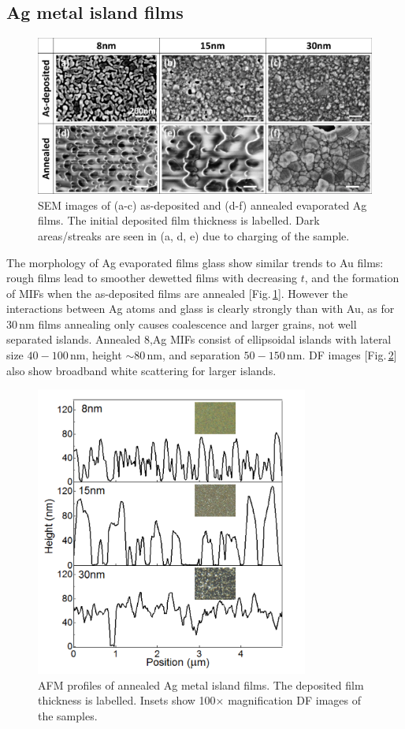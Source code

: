 \subsection{Ag metal island films}
\begin{figure}[ht] 
\centering    
\includegraphics[width=\textwidth]{Fig4}
\caption{SEM images of (a-c) as-deposited and (d-f) annealed evaporated Ag films. The initial deposited film thickness is labelled. Dark areas/streaks are seen in (a, d, e) due to charging of the sample.}
\label{6Fig4}
\end{figure}
The morphology of Ag evaporated films glass show similar trends to Au films: rough films lead to smoother dewetted films with decreasing $t$, and the formation of MIFs when the as-deposited films are annealed [Fig.\,\ref{6Fig4}]. However the interactions between Ag atoms and glass is clearly strongly than with Au, as for 30\,nm films annealing only causes coalescence and larger grains, not well separated islands. Annealed 8,\nm Ag MIFs consist of ellipsoidal islands with lateral size $40-100$\,nm, height $\sim80$\,nm, and separation $50-150$\,nm. DF images [Fig.\,\ref{6Fig5}] also show broadband white scattering for larger islands. 

\begin{figure}[ht] 
\centering    
\includegraphics[width=0.8\textwidth]{Fig5}
\caption{AFM profiles of annealed Ag metal island films. The deposited film thickness is labelled. Insets show 100$\times$ magnification DF images of the samples.}
\label{6Fig5}
\end{figure}

